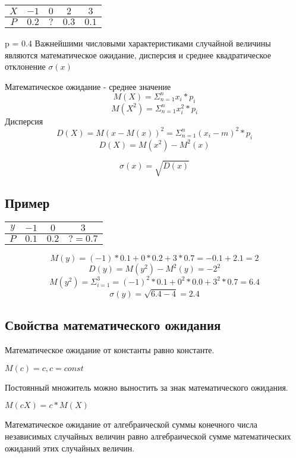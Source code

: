 \documentclass[a4paper]{article}
\begin{document}
\begin{table}[ht]
\centering
\begin{tabular}{|c|c|c|c|c|}
\hline
$X$ & $-1$ & $0$ & $2$ & $3$ \\
\hline
$P$ & $0.2$ & $?$ & $0.3$ & $0.1$ \\
\hline
\end{tabular}
\end{table}

p = 0.4
Важнейшими числовыми характеристиками случайной величины являются математическое ожидание,
дисперсия и среднее квадратическое отклонение $\sigma(x)$

Математическое ожидание - среднее значение
$$ M(X) = \Sigma_{n=1}^n x_i*p_i$$
$$ M(X^2) = \Sigma_{n=1}^n x_i^2*p_i$$
Дисперсия 
$$ D(X) = M(x - M(x))^2 = \Sigma^n_{n=1}(x_i - m)^2*p_i$$
$$ D(X) = M(x^2) - M^2(x) $$

$$ \sigma(x) = \sqrt{D(x)} $$

\subsection{Пример}


\begin{table}[ht]
\centering
\begin{tabular}{|c|c|c|c|}
\hline
$y$ & $-1$ & $0$ & $3$ \\
\hline
$P$ & $0.1$ & $0.2$ & $? = 0.7$ \\
\hline
\end{tabular}
\end{table}

$$ M(y) = (-1) * 0.1 + 0 * 0.2 + 3 * 0.7 = -0.1 + 2.1 = 2$$
$$ D(y) = M(y^2) - M^2(y) = -2^2$$
$$ M(y^2) = \Sigma^3_{i=1} = (-1)^2 * 0.1 + 0^2*0.0 + 3^2*0.7 = 6.4$$
$$ \sigma(y) = \sqrt{6.4 - 4} = 2.4$$

\subsection{Свойства математического ожидания}

Математическое ожидание от константы равно константе.

$ M(c) = c, c = const $

Постоянный множитель можно выностить за знак математического ожидания. 

$ M(cX) = c * M(X)$

Математическое ожидание от алгебраической суммы конечного числа независимых случайных величин
равно алгебраической сумме математических ожиданий этих случайных величин.
\end{document}
